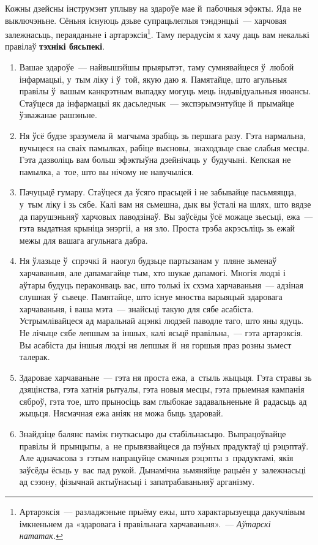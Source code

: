 Кожны дзейсны інструмэнт уплыву на здароўе мае й~пабочныя эфэкты. Яда не выключэньне. Сёньня існуюць дзьве супрацьлеглыя тэндэнцыі~--- харчовая залежнасьць, пераяданьне і артарэксія\footnote{Артарэксія~--- разладжэньне прыёму ежы, што характарызуецца дакучлівым імкненьнем да «здаровага і правільнага харчаваньня».~--- \emph{Аўтарскі нататак.}}. Таму перадусім я хачу даць вам некалькі правілаў \textbf{тэхнікі бясьпекі}.
\begin{enumerate}[itemindent=3em,labelwidth=1.5em,leftmargin=0pt,nosep]
  \item Вашае здароўе~--- найвышэйшы прыярытэт, таму сумнявайцеся ў~любой інфармацыі, у~тым ліку і ў~той, якую даю я. Памятайце, што агульныя правілы ў~вашым канкрэтным выпадку могуць мець індывідуальныя нюансы. Стаўцеся да інфармацыі як дасьледчык~--- экспэрымэнтуйце й~прымайце ўзважанае рашэньне.
  \item Ня ўсё будзе зразумела й~магчыма зрабіць зь першага разу. Гэта нармальна, вучыцеся на сваіх памылках, рабіце высновы, знаходзьце свае слабыя месцы. Гэта дазволіць вам больш эфэктыўна дзейнічаць у~будучыні. Кепская не памылка, а~тое, што вы нічому не навучыліся.
  \item Пачуцьцё гумару. Стаўцеся да ўсяго прасьцей і не забывайце пасьмяяцца, у~тым ліку і зь сябе. Калі вам ня сьмешна, дык вы ўсталі на шлях, што вядзе да парушэньняў харчовых паводзінаў. Вы заўсёды ўсё можаце зьесьці, ежа~--- гэта выдатная крыніца энэргіі, а~ня зло. Проста трэба акрэсьліць зь ежай межы для вашага агульнага дабра.
  \item Ня ўлазьце ў~спрэчкі й~наогул будзьце партызанам у~пляне зьменаў харчаваньня, але дапамагайце тым, хто шукае дапамогі. Многія людзі і аўтары будуць пераконваць вас, што толькі іх схэма харчаваньня~--- адзіная слушная ў~сьвеце. Памятайце, што існуе мноства варыяцый здаровага харчаваньня, і ваша мэта~--- знайсьці такую для сябе асабіста. Устрымлівайцеся ад маральнай ацэнкі людзей паводле таго, што яны ядуць. Не лічыце сябе лепшым за іншых, калі ясьцё правільна,~--- гэта артарэксія. Вы асабіста ды іншыя людзі ня лепшыя й~ня горшыя праз розны зьмест талерак.
  \item Здаровае харчаваньне~--- гэта ня проста ежа, а~стыль жыцьця. Гэта стравы зь дзяцінства, гэта хатнія рытуалы, гэта новыя месцы, гэта прыемная кампанія сяброў, гэта тое, што прыносіць вам глыбокае задавальненьне й~радасьць ад жыцьця. Нясмачная ежа аніяк ня можа быць здаровай.
  \item Знайдзіце балянс паміж гнуткасьцю ды стабільнасьцю. Выпрацоўвайце правілы й~прынцыпы, а~не прывязвайцеся да пэўных прадуктаў ці рэцэптаў. Але адначасова з~гэтым напрацуйце смачныя рэцэпты з~прадуктамі, якія заўсёды ёсьць у~вас пад рукой. Дынамічна зьмяняйце рацыён у~залежнасьці ад сэзону, фізычнай актыўнасьці і запатрабаваньняў арганізму.

\end{enumerate}
